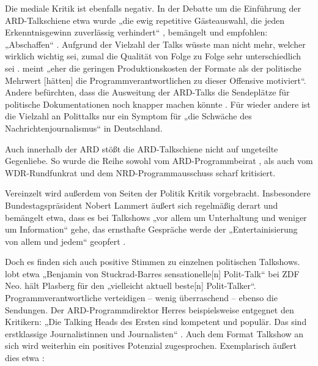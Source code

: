 Die mediale Kritik ist ebenfalls negativ. In der Debatte um die Einführung der ARD-Talkschiene etwa wurde „die ewig repetitive Gästeauswahl, die jeden Erkenntnisgewinn zuverlässig verhindert“ \parencite{harnaschUeberfluessigeARDTalkshows2012}, bemängelt und empfohlen: „Abschaffen“ \parencite{harnaschUeberfluessigeARDTalkshows2012}. Aufgrund der Vielzahl der Talks wüsste man nicht mehr, welcher wirklich wichtig sei, zumal die Qualität von Folge zu Folge sehr unterschiedlich sei \parencite[vgl.][]{barfussPolitikTalkshowsARD2012}. \textcite{doernerFuenfPolitischeTalkshows2012} meint „eher die geringen Produktionskosten der Formate als der politische Mehrwert [hätten] die Programmverantwortlichen zu dieser Offensive motiviert“. Andere befürchten, dass die Ausweitung der ARD-Talks die Sendeplätze für politische Dokumentationen noch knapper machen könnte \parencite{o.a.TalkGegenDokus2012}. Für wieder andere ist die Vielzahl an Polittalks nur ein Symptom für „die Schwäche des Nachrichtenjournalismus“ \parencite{schloemannUeberschussrechnung2012} in Deutschland.

Auch innerhalb der ARD stößt die ARD-Talkschiene nicht auf ungeteilte Gegenliebe. So wurde die Reihe sowohl vom ARD-Programmbeirat \parencite*{ard-programmbeiratTalkformateImErsten2012}, als auch vom WDR-Rundfunkrat \parencite*{wdr-rundfunkratStellungnahmeProgrammausschussesFuer2012} und dem NRD-Programmausschuss \parencite{harbuschGeheimPapierARDKritisiert2012} scharf kritisiert.

Vereinzelt wird außerdem von Seiten der Politik Kritik vorgebracht. Insbesondere Bundestagspräsident Nobert Lammert äußert sich regelmäßig derart und bemängelt etwa, dass es bei Talkshows „vor allem um Unterhaltung und weniger um Information“ \parencite{kammholzLammertPolitikerSind2012} gehe, das ernsthafte Gespräche werde der „Entertainisierung von allem und jedem“ geopfert \parencites{brauckMichDuerfteEs2011}[vgl. auch][]{gaeblerInterviewMitDr2011}.

Doch es finden sich auch positive Stimmen zu einzelnen politischen Talkshows. \textcite{harnaschUeberfluessigeARDTalkshows2012} lobt etwa „Benjamin von Stuckrad-Barres sensationelle[n] Polit-Talk“ bei ZDF Neo. \textcite{weisTalkshowFlutImErsten2012} hält Plasberg für den „vielleicht aktuell beste[n] Polit-Talker“. Programmverantwortliche verteidigen – wenig überraschend – ebenso die Sendungen. Der ARD-Programmdirektor Herres beispielsweise entgegnet den Kritikern: „Die Talking Heads des Ersten sind kompetent und populär. Das sind erstklassige Journalistinnen und Journalisten“ \parencite{o.a.EindrucksvolleIntensitaet2012}. Auch dem Format Talkshow an sich wird weiterhin ein positives Potenzial zugesprochen. Exemplarisch äußert dies etwa \textcite{doernerFuenfPolitischeTalkshows2012}:

